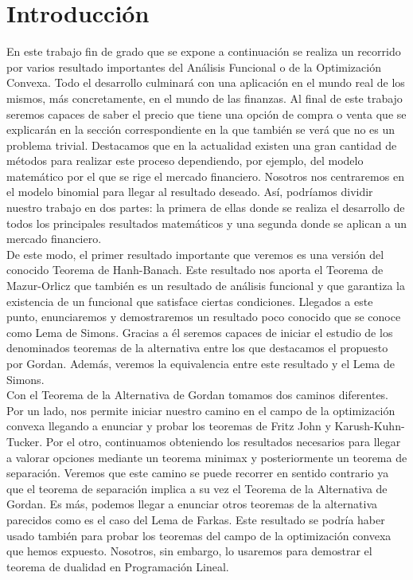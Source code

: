 \chapter{Introducción}

En este trabajo fin de grado que se expone a continuación se realiza un recorrido por varios resultado importantes del Análisis Funcional o de la Optimización Convexa. Todo el desarrollo culminará con una aplicación en el mundo real de los mismos, más concretamente, en el mundo de las finanzas. Al final de este trabajo seremos capaces de saber el precio que tiene una opción de compra o venta que se explicarán en la sección correspondiente en la que también se verá que no es un problema trivial. Destacamos que en la actualidad existen una gran cantidad de métodos para realizar este proceso dependiendo, por ejemplo, del modelo matemático por el que se rige el mercado financiero. Nosotros nos centraremos en el modelo binomial para llegar al resultado deseado. Así, podríamos dividir nuestro trabajo en dos partes: la primera de ellas donde se realiza el desarrollo de todos los principales resultados matemáticos y una segunda donde se aplican a un mercado financiero.  \\

De este modo, el primer resultado importante que veremos es una versión del conocido Teorema de Hanh-Banach. Este resultado nos aporta el Teorema de Mazur-Orlicz que también es un resultado de análisis funcional y que garantiza la existencia de un funcional que satisface ciertas condiciones. Llegados a este punto, enunciaremos y demostraremos un resultado poco conocido que se conoce como Lema de Simons. Gracias a él seremos capaces de iniciar el estudio de los denominados teoremas de la alternativa entre los que destacamos el propuesto por Gordan. Además, veremos la equivalencia entre este resultado y el Lema de Simons. \\

Con el Teorema de la Alternativa de Gordan tomamos dos caminos diferentes. Por un lado, nos permite iniciar nuestro camino en el campo de la optimización convexa llegando a enunciar y probar los teoremas de Fritz John y Karush-Kuhn-Tucker. Por el otro, continuamos obteniendo los resultados necesarios para llegar a valorar opciones mediante un teorema minimax y posteriormente un teorema de separación. Veremos que este camino se puede recorrer en sentido contrario ya que el teorema de separación implica a su vez el Teorema de la Alternativa de Gordan. Es más, podemos llegar a enunciar otros teoremas de la alternativa parecidos como es el caso del Lema de Farkas. Este resultado se podría haber usado también para probar los teoremas del campo de la optimización convexa que hemos expuesto. Nosotros, sin embargo, lo usaremos para demostrar el teorema de dualidad en Programación Lineal. \\

